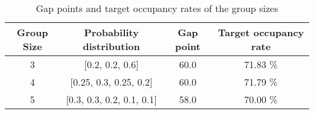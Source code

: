 \begin{table}[ht]
\centering
\caption{Gap points and target occupancy rates of the group sizes}
\begin{tabular}{|c|c|c|c|}
\hline
   Group Size & Probability distribution & Gap point & Target occupancy rate \\
\hline
   3 & [0.2, 0.2, 0.6] & 60.0  & 71.83 \%  \\
   4 & [0.25, 0.3, 0.25, 0.2] & 60.0 & 71.79 \%   \\ 
   5 & [0.3, 0.3, 0.2, 0.1, 0.1] & 58.0 & 70.00 \% \\
   \hline
\end{tabular}
\end{table}




